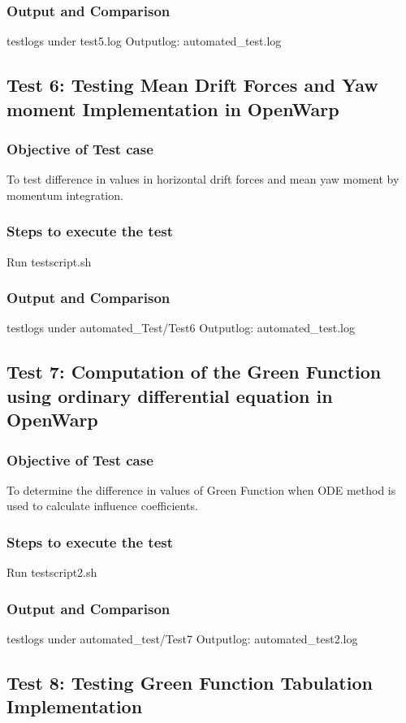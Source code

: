 \documentclass[12pt]{article}
\begin{document}
\subsubsection{Output and Comparison}
testlogs under test5.log
Outputlog: automated_test.log

\subsection{Test 6: Testing Mean Drift Forces and Yaw moment Implementation in OpenWarp}
\subsubsection{Objective of Test case}
To test difference in values in horizontal drift forces and mean yaw moment by momentum integration.
\subsubsection{Steps to execute the test}
Run testscript.sh
\subsubsection{Output and Comparison}
testlogs under automated_Test/Test6
Outputlog: automated_test.log

\subsection{Test 7: Computation of the Green Function using ordinary differential equation in OpenWarp}
\subsubsection{Objective of Test case}
To determine the difference in values of Green Function when ODE method is used to calculate influence coefficients.
\subsubsection{Steps to execute the test}
Run testscript2.sh
\subsubsection{Output and Comparison}
testlogs under automated_test/Test7
Outputlog: automated_test2.log

\subsection{Test 8: Testing Green Function Tabulation Implementation}
\end{document}
